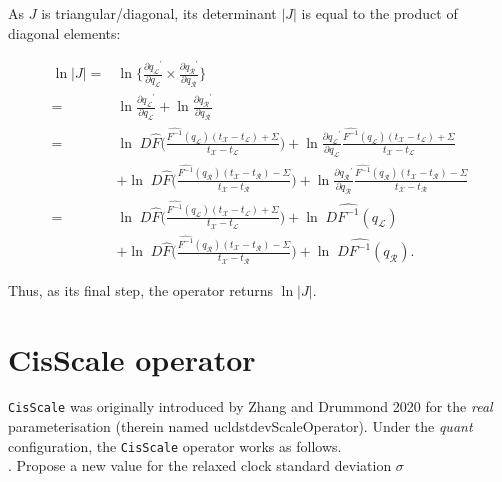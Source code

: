 \documentclass[12pt]{article}
\begin{document}
As $J$ is triangular/diagonal, its determinant $|J|$ is equal to the product of diagonal elements:



\begin{align}
	\ln |J| =&  \ln \{ \frac{\partial {q_\mathcal{L}}^\prime}{\partial q_\mathcal{L}} \times \frac{\partial {q_\mathcal{R}}^\prime}{\partial q_\mathcal{R}} \} \nonumber \\
			=& \ln  \frac{\partial {q_\mathcal{L}}^\prime}{\partial q_\mathcal{L}} + \ln \frac{\partial {q_\mathcal{R}}^\prime}{\partial q_\mathcal{R}}\nonumber \\
			=& \ln \; D \hat{F}\Big( \frac{\hat{F^{-1}} (q_\mathcal{L}) (t_\mathcal{X} - t_\mathcal{L}) + \Sigma}{t_\mathcal{X} - t_\mathcal{L}} \big) + \ln \frac{\partial {q_\mathcal{L}}^\prime}{\partial q_\mathcal{L}}  \frac{\hat{F^{-1}} (q_\mathcal{L}) (t_\mathcal{X} - t_\mathcal{L}) + \Sigma}{t_\mathcal{X} - t_\mathcal{L}} \nonumber\\
			&+ \ln \; D \hat{F}\Big( \frac{\hat{F^{-1}} (q_\mathcal{R}) (t_\mathcal{X} - t_\mathcal{R}) - \Sigma}{t_\mathcal{X} - t_\mathcal{R}} \big) + \ln \frac{\partial {q_\mathcal{R}}^\prime}{\partial q_\mathcal{R}}  \frac{\hat{F^{-1}} (q_\mathcal{R}) (t_\mathcal{X} - t_\mathcal{R}) - \Sigma}{t_\mathcal{X} - t_\mathcal{R}} \nonumber\\
			=& \ln \; D \hat{F}\Big( \frac{\hat{F^{-1}} (q_\mathcal{L}) (t_\mathcal{X} - t_\mathcal{L}) + \Sigma}{t_\mathcal{X} - t_\mathcal{L}} \big) + \ln \; D \hat{F^{-1}} (q_\mathcal{L}) \nonumber \\
			&+ \ln \; D \hat{F}\Big( \frac{\hat{F^{-1}} (q_\mathcal{R}) (t_\mathcal{X} - t_\mathcal{R}) - \Sigma}{t_\mathcal{X} - t_\mathcal{R}} \big) + \ln \; D\hat{F^{-1}} (q_\mathcal{R}) .
\end{align}


Thus, as its final step, the operator returns $\ln |J|$.



\clearpage
\section{CisScale operator}

\texttt{CisScale} was originally introduced by Zhang and Drummond 2020 for the \textit{real} parameterisation (therein named ucldstdevScaleOperator).
Under the \textit{quant} configuration, the \texttt{CisScale} operator works as follows. \\

. Propose a new value for the relaxed clock standard deviation $\sigma$
\end{document}
